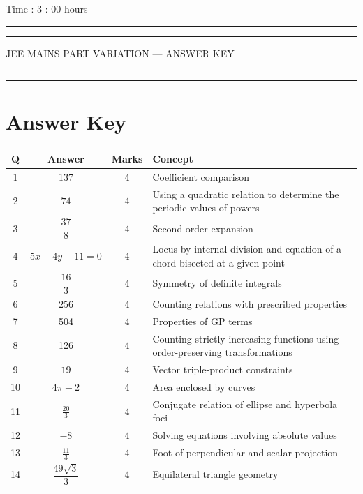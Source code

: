 \documentclass[11pt,a4paper]{article}
\begin{document}
\vspace{2mm}
 \hfill {Time : 3 : 00 hours}
\noindent\rule{\linewidth}{1.1pt}\vspace{-1mm}\noindent\rule{\linewidth}{0.5pt}
{\centering \Large {JEE MAINS PART VARIATION --- ANSWER KEY}\par}
\noindent\rule{\linewidth}{1.1pt}\vspace{-1mm}\noindent\rule{\linewidth}{0.5pt}
\vspace{2mm}

\section*{Answer Key}
\noindent\begin{tabularx}{\linewidth}{|c|c|c|X|}\hline
Q & Answer & Marks & Concept \\\hline
1 & 137 & 4 & Coefficient comparison \\\hline
2 & $74$ & 4 & Using a quadratic relation to determine the periodic values of powers \\\hline
3 & $\dfrac{37}{8}$ & 4 & Second-order expansion \\\hline
4 & $5x-4y-11=0$ & 4 & Locus by internal division and equation of a chord bisected at a given point \\\hline
5 & \(\dfrac{16}{3}\) & 4 & Symmetry of definite integrals \\\hline
6 & $256$ & 4 & Counting relations with prescribed properties \\\hline
7 & 504 & 4 & Properties of GP terms \\\hline
8 & 126 & 4 & Counting strictly increasing functions using order-preserving transformations \\\hline
9 & $19$ & 4 & Vector triple-product constraints \\\hline
10 & $4\pi-2$ & 4 & Area enclosed by curves \\\hline
11 & $\frac{20}{3}$ & 4 & Conjugate relation of ellipse and hyperbola foci \\\hline
12 & \(-8\) & 4 & Solving equations involving absolute values \\\hline
13 & $\frac{11}{3}$ & 4 & Foot of perpendicular and scalar projection \\\hline
14 & $\dfrac{49\sqrt{3}}{3}$ & 4 & Equilateral triangle geometry \\\hline
\end{tabularx}
\end{document}
